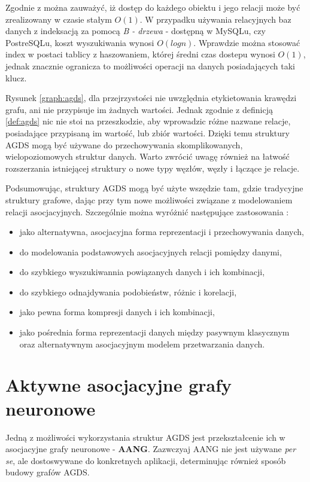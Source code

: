 Zgodnie z \cite[s. 110]{Horzyk} można zauważyć, iż dostęp do każdego obiektu i jego relacji może być zrealizowany w czasie stałym \(O(1)\). W przypadku używania relacyjnych baz danych
z indeksacją za pomocą \emph{B - drzewa} - dostępną w MySQLu, czy PostreSQLu, koszt wyszukiwania wynosi \(O(log n)\). Wprawdzie można stosować index w postaci tablicy z haszowaniem, 
której średni czas dostepu wynosi \(O(1)\), jednak znacznie ogranicza to możliwości operacji na danych posiadających taki klucz.

Rysunek \ref{graph:agds}, dla przejrzystości nie uwzględnia etykietowania krawędzi grafu, ani nie przypisuje im żadnych wartości. Jednak zgodnie z definicją \ref{def:agds} nic nie stoi
na przeszkodzie, aby wprowadzic różne nazwane relacje, posiadające przypisaną im wartość, lub zbiór wartości. Dzięki temu struktury AGDS mogą być używane do przechowywania skomplikowanych,
wielopoziomowych struktur danych. Warto zwrócić uwagę również na łatwość rozszerzania istniejącej struktury o nowe typy węzłów, węzły i łączące je relacje. 

Podsumowując, struktury AGDS mogą być użyte wszędzie tam, gdzie tradycyjne struktury grafowe, dając przy tym nowe możliwości związane z modelowaniem relacji asocjacyjnych.
Szczególnie można wyróżnić następujące zastosowania \cite{Horzyk}:
\begin{itemize}
\item jako alternatywna, asocjacyjna forma reprezentacji i przechowywania danych,
\item do modelowania podstawowych asocjacyjnych relacji pomiędzy danymi,
\item do szybkiego wyszukiwannia powiązanych danych i ich kombinacji,
\item do szybkiego odnajdywania podobieństw, różnic i korelacji,
\item jako pewna forma kompresji danych i ich kombinacji,
\item jako pośrednia forma reprezentacji danych między pasywnym klasycznym oraz alternatywnym asocjacyjnym modelem przetwarzania danych.
\end{itemize}

\section{Aktywne asocjacyjne grafy neuronowe}
\label{sec:AANG}

Jedną z możliwości wykorzystania struktur AGDS jest przekształcenie ich w asocjacyjne grafy neuronowe - \textbf{AANG}. Zazwczyaj AANG nie jest używane \emph{per se}, ale dostoswywane do konkretnych aplikacji, determinując również sposób budowy grafów AGDS.


